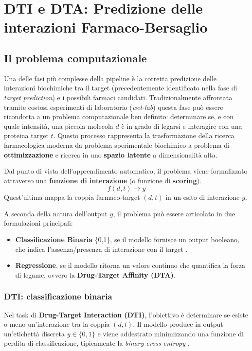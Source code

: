 \chapter{DTI e DTA: Predizione delle interazioni Farmaco-Bersaglio}

\section{Il problema computazionale}
Una delle fasi più complesse della pipeline è la corretta predizione delle
interazioni biochimiche tra il target (precedentemente identificato nella fase di
\textit{target prediction}) e i possibili farmaci candidati.
Tradizionalmente affrontata tramite costosi esperimenti di laboratorio (\textit{wet-lab}) questa fase può essere ricondotta a un problema computazionale ben definito: determinare se, e con quale intensità, una piccola molecola $d$ è in grado di legarsi e interagire con una proteina target $t$.
Questo processo rappresenta la trasformazione della ricerca farmacologica
moderna da problema sperimentale biochimico a problema di
\textbf{ottimizzazione} e ricerca in uno \textbf{spazio latente} a
dimensionalità alta.

Dal punto di vista dell'apprendimento automatico, il problema viene formalizzato attraverso una \textbf{funzione di interazione} (o funzione
di \textbf{scoring}).
\begin{equation}
    f(d,t) \xrightarrow{} y
\end{equation}
Quest'ultima mappa la coppia farmaco-target $(d, t)$ in un esito di interazione $y$.


A seconda della natura dell'output $y$, il problema può essere articolato in due formulazioni principali:
\begin{itemize}
    \item \textbf{Classificazione Binaria} \{0,1\}, se il modello
    fornisce un output booleano, che indica l'assenza/presenza di
    interazione con il target \cite{mondalAIdrivenDrugTarget2026a}.
    \item \textbf{Regressione}, se il modello ritorna un valore continuo
    che quantifica la forza di legame, ovvero la
    \textbf{Drug-Target Affinity (DTA)}.
\end{itemize}
\subsection{DTI: classificazione binaria}
Nel task di \textbf{Drug-Target Interaction (DTI)}, l'obiettivo è determinare se esiste o meno un'interazione tra la coppia $(d,t)$.
Il modello produce in output un'etichettà discreta $y \in \{0,1\}$ e viene addestrato minimizzando una funzione di perdita di classificazione, tipicamente la \textit{binary cross-entropy} \cite{ahmadMachineLearningDrugtarget2026}.
